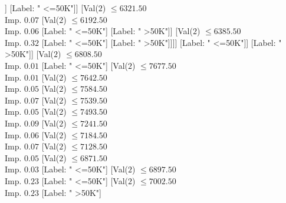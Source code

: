 \documentclass[margin=10pt]{standalone}
\begin{document}
\begin{forest}
																																												[Label: " >50K"]]
																																											[Label: " <=50K"]]
																																										[Val($2$) $ \leq 6321.50$ \\ Imp. $0.07$
																																											[Val($2$) $ \leq 6192.50$ \\ Imp. $0.06$
																																												[Label: " <=50K"]
																																												[Label: " >50K"]]
																																											[Val($2$) $ \leq 6385.50$ \\ Imp. $0.32$
																																												[Label: " <=50K"]
																																												[Label: " >50K"]]]]
																																									[Label: " <=50K"]]
																																								[Label: " >50K"]]
																																							[Val($2$) $ \leq 6808.50$ \\ Imp. $0.01$
																																								[Label: " <=50K"]
																																								[Val($2$) $ \leq 7677.50$ \\ Imp. $0.01$
																																									[Val($2$) $ \leq 7642.50$ \\ Imp. $0.05$
																																										[Val($2$) $ \leq 7584.50$ \\ Imp. $0.07$
																																											[Val($2$) $ \leq 7539.50$ \\ Imp. $0.05$
																																												[Val($2$) $ \leq 7493.50$ \\ Imp. $0.09$
																																													[Val($2$) $ \leq 7241.50$ \\ Imp. $0.06$
																																														[Val($2$) $ \leq 7184.50$ \\ Imp. $0.07$
																																															[Val($2$) $ \leq 7128.50$ \\ Imp. $0.05$
																																																[Val($2$) $ \leq 6871.50$ \\ Imp. $0.03$
																																																	[Label: " <=50K"]
																																																	[Val($2$) $ \leq 6897.50$ \\ Imp. $0.23$
																																																		[Label: " <=50K"]
																																																		[Val($2$) $ \leq 7002.50$ \\ Imp. $0.23$
																																																			[Label: " >50K"]

\end{forest}
\end{document}
